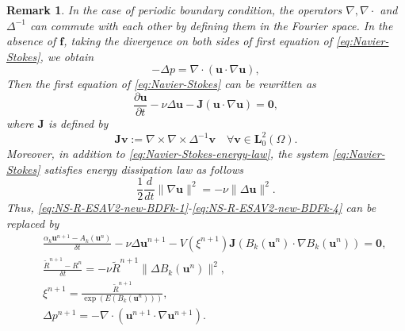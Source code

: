 \documentclass[final,review,onefignum,onetabnum]{siamart190516}
\theoremstyle{plain}
\newtheorem{remark}{\textbf{Remark}}[section]
\begin{document}
\begin{remark}
	In the case of periodic boundary condition, the operators $\nabla , \nabla \cdot$ and $\Delta^{-1}$ can commute with each other by defining them in the Fourier space. 
	In the absence of $\mathbf{f}$, taking the divergence on both sides of first equation of \eqref{eq:Navier-Stokes}, we obtain
	\begin{equation}
	-\Delta p=\nabla \cdot(\mathbf{u} \cdot \nabla \mathbf{u}),
	\end{equation} 
	Then the first equation of \eqref{eq:Navier-Stokes} can be rewritten as 
	\begin{equation}
	\frac{\partial \boldsymbol{u}}{\partial t}-\nu \Delta \boldsymbol{u}-\mathbf{J}(\boldsymbol{u} \cdot \nabla \boldsymbol{u})=\mathbf{0},
	\end{equation}
	where $\mathbf{J}$ is defined by
	\begin{equation}
	\mathbf{J} \mathbf{v}:=\nabla \times \nabla \times \Delta^{-1} \mathbf{v} \quad \forall \mathbf{v} \in \mathbf{L}_{0}^{2}(\Omega).
	\end{equation}
	 Moreover, in addition to \eqref{eq:Navier-Stokes-energy-law}, the system \eqref{eq:Navier-Stokes}  satisfies  energy dissipation law as follows
	\begin{equation}
	\frac{1}{2} \frac{d}{d t}\|\nabla \mathbf{u}\|^{2}=-\nu\|\Delta \mathbf{u}\|^{2}.
	\end{equation}
	Thus, \eqref{eq:NS-R-ESAV2-new-BDFk-1}-\eqref{eq:NS-R-ESAV2-new-BDFk-4} can be replaced by
	\begin{eqnarray}
 \label{eq:NS-R-ESAV2-new-BDFk-periodic-1}
& & \frac{\alpha_{k}\mathbf{u}^{n+1}-A_{k}\left(\mathbf{u}^{n}\right)}{\delta t}-\nu \Delta\mathbf{u}^{n+1}-V(\xi^{n+1})\mathbf{J}\left(B_{k}\left(\mathbf{u}^{n}\right) \cdot \nabla B_{k}\left(\mathbf{u}^{n}\right)\right)=\mathbf{0}, \\
 \label{eq:NS-R-ESAV2-new-BDFk-periodic-2}
& & \frac{\tilde{R}^{n+1}-R^{n}}{\delta t} =-\nu \tilde{R}^{n+1} \|\Delta B_{k}\left(\mathbf{u}^{n}\right)\|^{2}, \\
 \label{eq:NS-R-ESAV2-new-BDFk-periodic-3}
& & \xi^{n+1}=\frac{\tilde{R}^{n+1}}{\exp\left(E\left(B_{k}\left(\mathbf{u}^{n}\right)\right)\right)}, \\
 \label{eq:NS-R-ESAV2-new-BDFk-periodic-4}
& & \Delta p^{n+1}=-\nabla \cdot\left(\mathbf{u}^{n+1} \cdot \nabla \mathbf{u}^{n+1}\right).
\end{eqnarray}
\end{remark}
\end{document}
